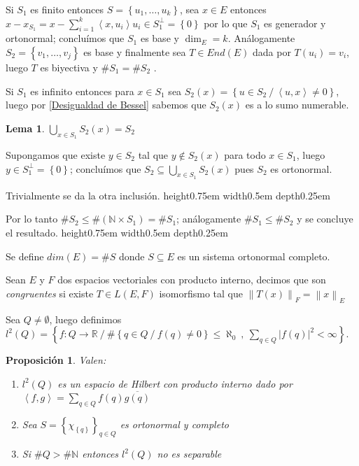 \documentclass[11pt]{article}
\newcommand{\R}{{\mathbb{R}}}
\newcommand{\N}{{\mathbb{N}}}
\newcommand{\norm}[1]{\left\lVert#1\right\rVert}
\newcommand{\abs}[1]{\left\lvert#1\right\rvert}
\newcommand{\ip}[1]{\left\langle#1\right\rangle}
\newcommand{\sett}[1]{\left\lbrace#1\right\rbrace}
\newcommand{\Bigcup}[2]{\bigcup\limits_{#1}{#2}}
\newcommand{\Bigsum}[2]{\sum\limits_{#1}{#2}}
\numberwithin{theorem}{subsection}
\newtheorem{lemma}[theorem]{Lema}
\newtheorem{proposition}[theorem]{Proposici\'on}
\newenvironment{proof}[1][Demostraci\'on]{\begin{trivlist}
		\item[\hskip \labelsep {\bfseries #1}]}{\end{trivlist}}
\newenvironment{definition}[1][Definici\'on]{\begin{trivlist}
		\item[\hskip \labelsep {\bfseries #1}]}{\end{trivlist}}
\newcommand{\qed}{\nobreak \ifvmode \relax \else
	\ifdim\lastskip<1.5em \hskip-\lastskip
	\hskip1.5em plus0em minus0.5em \fi \nobreak
	\vrule height0.75em width0.5em depth0.25em\fi}
\begin{document}
\begin{proof}
	Si $S_1$ es finito entonces $S = \sett{u_1, \dots, u_k}$, sea $x \in E$ entonces $x - x_{S_1} = x - \sum\limits_{i=1}^{k}{\ip{x,u_i}u_i} \in S_1^{\perp} = \sett{0}$ por lo que $S_1$ es generador y ortonormal; conclu\'imos que $S_1$ es base y $\dim_E = k$. An\'alogamente $S_2 = \sett{v_1 , \dots , v_j}$ es base y finalmente sea $T \in End(E)$ dada por $T(u_i) = v_i$, luego $T$ es biyectiva y $\# S_1 = \# S_2$ .
	
	Si $S_1$ es infinito entonces para $x \in S_1$ sea $S_2(x) = \sett{u \in S_2 \ / \ \ip{u,x} \neq 0}$, luego por \ref{Desigualdad de Bessel} sabemos que $S_2(x)$ es a lo sumo numerable.
	
	\begin{lemma}
		$\Bigcup{x \in S_1}{S_2(x)} = S_2$
	\end{lemma}
	
	\begin{proof}[Demostraci\'on (del Lema)]
		Supongamos que existe $y \in S_2$ tal que $y \not \in S_2(x)$ para todo $x \in S_1$, luego $y \in S_{1}^{\perp} = \sett{0}$; conclu\'imos que $S_2 \subseteq \Bigcup{x \in S_1}{S_2(x)}$ pues $S_2$ es ortonormal.
		
		Trivialmente se da la otra inclusi\'on. \qed
	\end{proof}
	
	Por lo tanto $\# S_2 \leq \# \left(\N \times S_1\right) = \# S_1$; an\'alogamente $\# S_1 \leq \# S_2$ y se concluye el resultado. \qed
	
\end{proof}

\begin{definition}
	Se define $dim(E) = \# S$ donde $S \subseteq E$ es un sistema ortonormal completo.
\end{definition}

\begin{definition}
	Sean $E$ y $F$ dos espacios vectoriales con producto interno, decimos que son \textit{congruentes} si existe $T \in L(E,F)$ isomorfismo tal que $\norm{T(x)}_{F} = \norm{x}_E$
\end{definition}

\begin{definition}
	Sea $Q \neq \emptyset$, luego definimos $l^2(Q) = \sett{f : Q \rightarrow \R \ / \ \# \sett{q \in Q \ / \ f(q) \neq 0} \leq \aleph_0 \ , \ \Bigsum{q \in Q}{\abs{f(q)}^2} < \infty}$.
\end{definition}

\begin{proposition}
	Valen:
	
	\begin{enumerate}
		\item $l^2(Q)$ es un espacio de Hilbert con producto interno dado por $\ip{f,g} = \Bigsum{q \in Q}{f(q)\overline{g(q)}}$
		\item Sea $S = \sett{\chi_{\sett{q}}}_{q \in Q}$ es ortonormal y completo
		\item Si $\# Q > \# \N$ entonces $l^2(Q)$ no es separable
	\end{enumerate}
	
\end{proposition}
\end{document}
